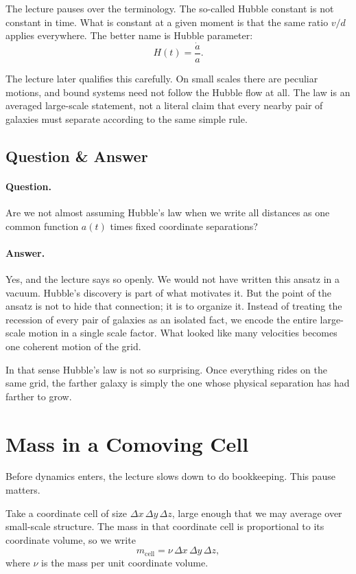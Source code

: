 The lecture pauses over the terminology. The so-called Hubble constant is not constant in time. What is constant at a given moment is that the same ratio \(v/d\) applies everywhere. The better name is Hubble parameter:
\begin{equation}
H(t)=\frac{\dot a}{a}.
\end{equation}

The lecture later qualifies this carefully. On small scales there are peculiar motions, and bound systems need not follow the Hubble flow at all. The law is an averaged large-scale statement, not a literal claim that every nearby pair of galaxies must separate according to the same simple rule.

\subsection{Question \& Answer}

\paragraph{Question.} Are we not almost assuming Hubble's law when we write all distances as one common function \(a(t)\) times fixed coordinate separations?

\paragraph{Answer.} Yes, and the lecture says so openly. We would not have written this ansatz in a vacuum. Hubble's discovery is part of what motivates it. But the point of the ansatz is not to hide that connection; it is to organize it. Instead of treating the recession of every pair of galaxies as an isolated fact, we encode the entire large-scale motion in a single scale factor. What looked like many velocities becomes one coherent motion of the grid.

In that sense Hubble's law is not so surprising. Once everything rides on the same grid, the farther galaxy is simply the one whose physical separation has had farther to grow.

\section{Mass in a Comoving Cell}

Before dynamics enters, the lecture slows down to do bookkeeping. This pause matters.

Take a coordinate cell of size \(\Delta x\,\Delta y\,\Delta z\), large enough that we may average over small-scale structure. The mass in that coordinate cell is proportional to its coordinate volume, so we write
\begin{equation}
m_{\text{cell}}=\nu\,\Delta x\,\Delta y\,\Delta z,
\end{equation}
where \(\nu\) is the mass per unit coordinate volume.

